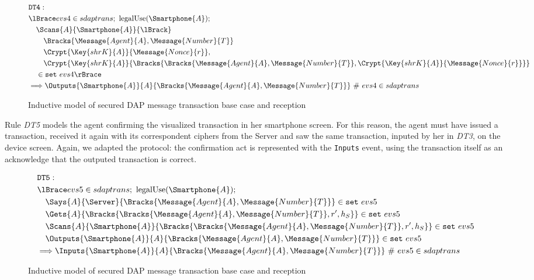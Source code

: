 \begin{figure}[!h]
  \begin{align*}
    & \texttt{DT4}: \newline \\
    & \lBrace evs4 \in sdaptrans;\ \text{legalUse}(\Smartphone{A}); \\
    & \quad \Scans{A}{\Smartphone{A}}{\lBrack} \\
    & \qquad \Bracks{\Message{Agent}{A}, \Message{Number}{T}} \\
    & \qquad \Crypt{\Key{shrK}{A}}{\Message{Nonce}{r}}, \\
    & \qquad \Crypt{\Key{shrK}{A}}{\Bracks{\Bracks{\Message{Agent}{A}, \Message{Number}{T}}, \Crypt{\Key{shrK}{A}}{\Message{Nonce}{r}}}} \\
    & \quad \in \texttt{set} \ evs4 \rBrace \\
    & \Longrightarrow \Outputs{\Smartphone{A}}{A}{\Bracks{\Message{Agent}{A}, \Message{Number}{T}}} \ \# \ evs4 \in sdaptrans
  \end{align*}
  \label{fig:dap-model-4}
  \caption{Inductive model of secured DAP message transaction base case and reception}
\end{figure}

Rule \textit{DT5} models the agent confirming the visualized transaction in her smartphone screen. For this reason, the agent must have issued a transaction, received it again with its correspondent ciphers from the Server and saw the same transaction, inputed by her in \textit{DT3}, on the device screen. Again, we adapted the protocol: the confirmation act is represented with the \texttt{Inputs} event, using the transaction itself as an acknowledge that the outputed transaction is correct.

\begin{figure}[!h]
  \begin{align*}
    & \texttt{DT5}: \newline \\
    & \lBrace evs5 \in sdaptrans;\ \text{legalUse}(\Smartphone{A}); \\
    & \quad \Says{A}{\Server}{\Bracks{\Message{Agent}{A}, \Message{Number}{T}}} \in \texttt{set} \ evs5 \\
    & \quad \Gets{A}{\Bracks{\Bracks{\Message{Agent}{A}, \Message{Number}{T}}, r', h_S}} \in \texttt{set} \ evs5 \\
    & \quad \Scans{A}{\Smartphone{A}}{\Bracks{\Bracks{\Message{Agent}{A}, \Message{Number}{T}}, r', h_S}} \in \texttt{set} \ evs5 \\
    & \quad \Outputs{\Smartphone{A}}{A}{\Bracks{\Message{Agent}{A}, \Message{Number}{T}}} \in \texttt{set} \ evs5 \\
    & \Longrightarrow \Inputs{\Smartphone{A}}{A}{\Bracks{\Message{Agent}{A}, \Message{Number}{T}}} \ \# \ evs5 \in sdaptrans
  \end{align*}
  \label{fig:dap-model-5}
  \caption{Inductive model of secured DAP message transaction base case and reception}
\end{figure}

